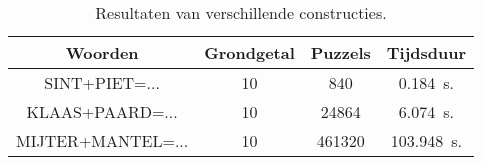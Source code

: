 \documentclass[10pt]{article}
\begin{document}
\begin{table}[h]
    \centering
    \caption{Resultaten van verschillende constructies.}
    \begin{tabular}{@{}cccc@{}}
        \toprule
        Woorden & Grondgetal & Puzzels & Tijdsduur \\ 
        \midrule
        SINT+PIET=... & 10 & 840 & \SI{0.184}{\second}. \\
        KLAAS+PAARD=... & 10 & 24864 & \SI{6.074}{\second}. \\
        MIJTER+MANTEL=... & 10 & 461320 & \SI{103.948}{\second}. \\
        \bottomrule
    \end{tabular}
\end{table}
\FloatBarrier
\end{document}
